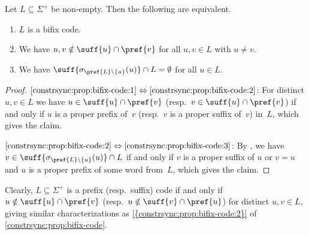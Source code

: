 \begin{proposition} \label{constrsync:prop:bifix-code}
	Let $L \subseteq \Sigma^+$ be non-empty. Then the following are equivalent.
	\begin{enumerate}
		\item \label{constrsync:prop:bifix-code:1} $L$ is a bifix code.
		
		\item \label{constrsync:prop:bifix-code:2} We have $u,v \notin \suff{u}\cap \pref{v}$ for all $u,v \in L$ with $u\ne v$.
		
		\item \label{constrsync:prop:bifix-code:3} We have $\suff{\sigma_{\pref{L}\setminus\{u\}}(u)} \cap L = \emptyset$	
		for all $u \in L$.
	\end{enumerate}
\end{proposition}
\begin{proof}
$\ref{constrsync:prop:bifix-code:1} \Leftrightarrow \ref{constrsync:prop:bifix-code:2}$: 
For distinct $u,v \in L$ we have $u \in \suff{u} \cap \pref{v}$ (resp.~$v \in \suff{u} \cap \pref{v}$)
if and only if $u$ is a proper prefix of~$v$ (resp.~$v$ is a proper suffix of~$v$) in~$L$,
which gives the claim.

$\ref{constrsync:prop:bifix-code:2} \Leftrightarrow \ref{constrsync:prop:bifix-code:3}$: 
By , we have $v \in \suff{\sigma_{\pref{L}\setminus\{u\}}(u)} \cap L$ if and only if $v$ is a proper suffix of $u$
or $v = u$ and $u$ is a proper prefix of some word from~$L$,
which gives the claim.
\end{proof}

Clearly, $L \subseteq \Sigma^+$ is a prefix (resp.~suffix) code
if and only if $u \notin \suff{u} \cap \pref{v}$ (resp.~$u \notin \suff{v} \cap \pref{u}$) for distinct $u,v \in L$, 
giving similar characterizations as \cref{{constrsync:prop:bifix-code:2}} of \cref{constrsync:prop:bifix-code}.


